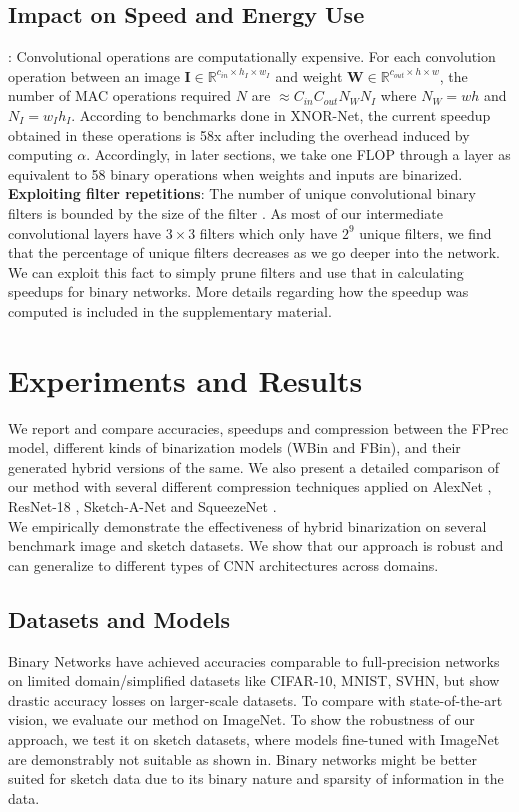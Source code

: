 \documentclass[10pt,twocolumn,letterpaper]{article}
\begin{document}
\subsection{Impact on Speed and Energy Use}
: Convolutional operations are computationally expensive. For each convolution operation between an image $\mathbf{I} \in \mathbb{R}^{c_{in} \times h_I \times w_I}$ and weight $\mathbf{W} \in \mathbb{R}^{c_{out} \times h \times w}$, the number of MAC operations required $N$ are $\approx C_{in}C_{out}N_WN_I$ where $N_W = wh$ and $N_I = w_Ih_I$. According to benchmarks done in XNOR-Net, the current speedup obtained in these operations is 58x after including the overhead induced by computing $\alpha$. Accordingly, in later sections, we take one FLOP through a layer as equivalent to 58 binary operations when weights and inputs are binarized. \\ 
{\bf Exploiting filter repetitions}: The number of unique convolutional binary filters is bounded by the size of the filter \cite{hubara2016quantized}. As most of our intermediate convolutional layers have $3\times3$ filters which only have $2^9$ unique filters, we find that the percentage of unique filters decreases as we go deeper into the network. We can exploit this fact to simply prune filters and use that in calculating speedups for binary networks. More details regarding how the speedup was computed is included in the supplementary material.


\section{Experiments and Results}

We report and compare accuracies, speedups and compression between the FPrec model, different kinds of binarization models (WBin and FBin), and their generated hybrid versions of the same. We also present a detailed comparison of our method with several different compression techniques applied on AlexNet \cite{alex2012alexnet}, ResNet-18 \cite{he2016deep}, Sketch-A-Net \cite{eitz2012hdhso} and SqueezeNet \cite{iandola2016squeezenet}. \\
We empirically demonstrate the effectiveness of hybrid binarization on several benchmark image and sketch datasets. We show that our approach is robust and can generalize to different types of CNN architectures across domains.

\subsection{Datasets and Models}
Binary Networks have achieved accuracies comparable to full-precision networks on limited domain/simplified datasets like CIFAR-10, MNIST, SVHN, but show drastic accuracy losses on larger-scale datasets. To compare with state-of-the-art vision, we evaluate our method on ImageNet\cite{imagenet_cvpr09}. To show the robustness of our approach, we test it on sketch datasets, where models fine-tuned with ImageNet are demonstrably not suitable as shown in\cite{yu2015sketch}. Binary networks might be better suited for sketch data due to its binary nature and sparsity of information in the data. 
\end{document}
